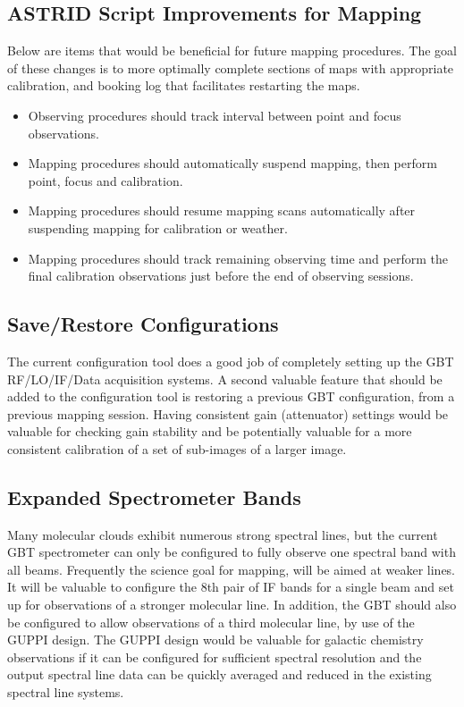 \documentclass[12pt,twoside]{article}
\begin{document}
\subsection{ASTRID Script Improvements for Mapping}
Below are items that would be beneficial for future mapping procedures.
The goal of these changes is to more optimally complete sections of maps with 
appropriate calibration, and booking log that facilitates restarting the maps.

\begin{itemize}
\item Observing procedures should track interval between point and focus observations.
\item Mapping procedures should automatically suspend mapping, then perform point, focus
and calibration.
\item Mapping procedures should resume mapping scans automatically after suspending
mapping for calibration or weather.
\item Mapping procedures should track remaining observing time and perform
the final calibration observations just before the end of observing sessions.
\end{itemize}

\subsection{Save/Restore Configurations}

The current configuration tool does a good job of completely setting up
the GBT RF/LO/IF/Data acquisition systems. 
A second valuable feature that should be added to the configuration tool is restoring
a previous GBT configuration, from a previous mapping session.  Having consistent
gain (attenuator) settings would be valuable for checking gain stability
and be potentially valuable for a more consistent calibration of a set of 
sub-images of a larger image.

\subsection{Expanded Spectrometer Bands}
Many molecular clouds exhibit numerous strong spectral lines, but the
current GBT spectrometer can only be configured to fully observe one spectral 
band with all beams.   Frequently the science goal for mapping, will
be aimed at weaker lines.  It will be valuable to configure the 8th pair of IF
bands for a single beam and set up for observations of a stronger molecular
line.   In addition, the GBT should also be configured to allow observations
of a third molecular line, by use of the GUPPI design.   The GUPPI design
would be valuable for galactic chemistry observations if it can be configured
for sufficient spectral resolution and the output spectral line data
can be quickly averaged and reduced in the existing spectral line systems.
\end{document}
